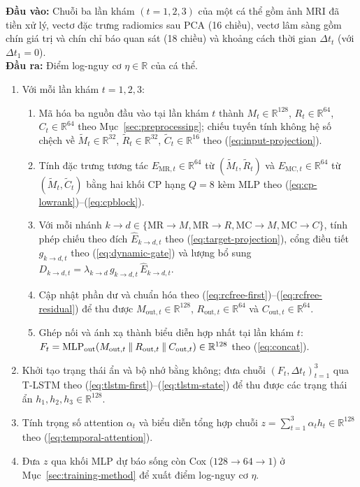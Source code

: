 \begin{algorithm}[H]
\caption{Luồng tính xuôi của mô hình RC-Free Pairwise Fusion}
\label{alg:rcfree-forward}
\small
\textbf{Đầu vào:} Chuỗi ba lần khám $(t=1,2,3)$ của một cá thể gồm ảnh MRI đã tiền xử lý, vectơ đặc trưng radiomics sau PCA (16 chiều), vectơ lâm sàng gồm chín giá trị và chín chỉ báo quan sát (18 chiều) và khoảng cách thời gian $\Delta t_t$ (với $\Delta t_1=0$).\\
\textbf{Đầu ra:} Điểm log-nguy cơ $\eta\in\mathbb R$ của cá thể.
\begin{enumerate}[leftmargin=1.2em,label=\arabic*.,itemsep=0.2em]
\item Với mỗi lần khám $t=1,2,3$:
\begin{enumerate}[leftmargin=1.2em,label=\alph*.,itemsep=0.15em]
\item Mã hóa ba nguồn đầu vào tại lần khám $t$ thành $M_t\in\mathbb R^{128}$, $R_t\in\mathbb R^{64}$, $C_t\in\mathbb R^{64}$ theo Mục~\ref{sec:preprocessing}; chiếu tuyến tính không hệ số chệch về $\widetilde M_t\in\mathbb R^{32}$, $\widetilde R_t\in\mathbb R^{32}$, $\widetilde C_t\in\mathbb R^{16}$ theo (\ref{eq:input-projection}).
\item Tính đặc trưng tương tác $E_{\mathrm{MR},t}\in\mathbb R^{64}$ từ $(\widetilde M_t,\widetilde R_t)$ và $E_{\mathrm{MC},t}\in\mathbb R^{64}$ từ $(\widetilde M_t,\widetilde C_t)$ bằng hai khối CP hạng $Q=8$ kèm MLP theo (\ref{eq:cp-lowrank})--(\ref{eq:cpblock}).
\item Với mỗi nhánh $k\to d\in\{\mathrm{MR}\to M,\mathrm{MR}\to R,\mathrm{MC}\to M,\mathrm{MC}\to C\}$, tính phép chiếu theo đích $\widehat E_{k\to d,t}$ theo (\ref{eq:target-projection}), cổng điều tiết $g_{k\to d,t}$ theo (\ref{eq:dynamic-gate}) và lượng bổ sung $D_{k\to d,t}=\lambda_{k\to d}\,g_{k\to d,t}\,\widehat E_{k\to d,t}$.
\item Cập nhật phần dư và chuẩn hóa theo (\ref{eq:rcfree-first})--(\ref{eq:rcfree-residual}) để thu được $M_{\mathrm{out},t}\in\mathbb R^{128}$, $R_{\mathrm{out},t}\in\mathbb R^{64}$ và $C_{\mathrm{out},t}\in\mathbb R^{64}$.
\item Ghép nối và ánh xạ thành biểu diễn hợp nhất tại lần khám $t$: $F_t=\operatorname{MLP}_{\mathrm{out}}(M_{\mathrm{out},t}\mathbin{\|} R_{\mathrm{out},t}\mathbin{\|} C_{\mathrm{out},t})\in\mathbb R^{128}$ theo (\ref{eq:concat}).
\end{enumerate}
\item Khởi tạo trạng thái ẩn và bộ nhớ bằng không; đưa chuỗi $(F_t,\Delta t_t)_{t=1}^3$ qua T-LSTM theo (\ref{eq:tlstm-first})--(\ref{eq:tlstm-state}) để thu được các trạng thái ẩn $h_1,h_2,h_3\in\mathbb R^{128}$.
\item Tính trọng số attention $\alpha_t$ và biểu diễn tổng hợp chuỗi $z=\sum_{t=1}^3\alpha_t h_t\in\mathbb R^{128}$ theo (\ref{eq:temporal-attention}).
\item Đưa $z$ qua khối MLP dự báo sống còn Cox ($128\to64\to1$) ở Mục~\ref{sec:training-method} để xuất điểm log-nguy cơ $\eta$.
\end{enumerate}
\end{algorithm}
